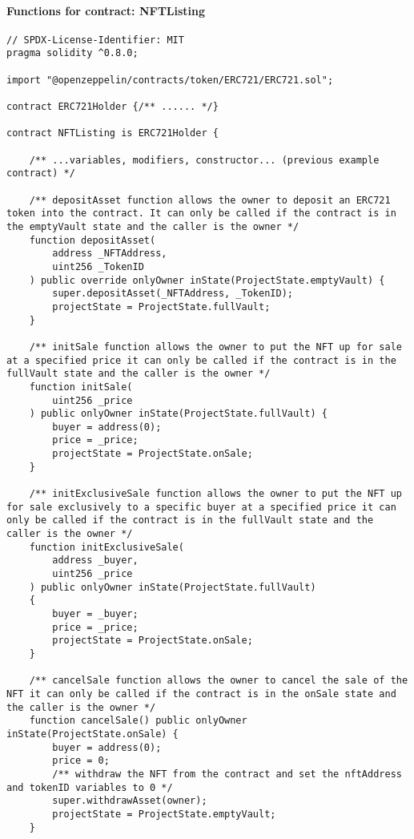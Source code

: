 \documentclass{article}
\theoremstyle{theorem}
\theoremstyle{definition}
\theoremstyle{remark}
\begin{document}
\paragraph{Functions for contract: \colorbox{Gainsboro!60!Lavender}{NFTListing}}

\begin{itemize}
\begin{lstlisting}
// SPDX-License-Identifier: MIT
pragma solidity ^0.8.0;

import "@openzeppelin/contracts/token/ERC721/ERC721.sol";

contract ERC721Holder {/** ...... */}

contract NFTListing is ERC721Holder {

    /** ...variables, modifiers, constructor... (previous example contract) */
    
    /** depositAsset function allows the owner to deposit an ERC721 token into the contract. It can only be called if the contract is in the emptyVault state and the caller is the owner */
    function depositAsset(
        address _NFTAddress,
        uint256 _TokenID
    ) public override onlyOwner inState(ProjectState.emptyVault) {
        super.depositAsset(_NFTAddress, _TokenID);
        projectState = ProjectState.fullVault;
    }

    /** initSale function allows the owner to put the NFT up for sale at a specified price it can only be called if the contract is in the fullVault state and the caller is the owner */
    function initSale(
        uint256 _price
    ) public onlyOwner inState(ProjectState.fullVault) {
        buyer = address(0);
        price = _price;
        projectState = ProjectState.onSale;
    }

    /** initExclusiveSale function allows the owner to put the NFT up for sale exclusively to a specific buyer at a specified price it can only be called if the contract is in the fullVault state and the caller is the owner */
    function initExclusiveSale(
        address _buyer,
        uint256 _price
    ) public onlyOwner inState(ProjectState.fullVault)
    {
        buyer = _buyer;
        price = _price;
        projectState = ProjectState.onSale; 
    }

    /** cancelSale function allows the owner to cancel the sale of the NFT it can only be called if the contract is in the onSale state and the caller is the owner */
    function cancelSale() public onlyOwner inState(ProjectState.onSale) {
        buyer = address(0);
        price = 0;
        /** withdraw the NFT from the contract and set the nftAddress and tokenID variables to 0 */
        super.withdrawAsset(owner);
        projectState = ProjectState.emptyVault;
    }


\end{lstlisting}
\end{itemize}
\end{document}

